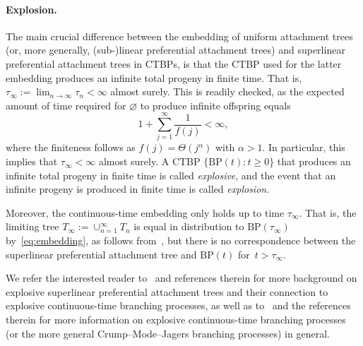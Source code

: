 \documentclass[11pt]{article}
\numberwithin{equation}{section}
\newcommand{\be}{\begin{equation}}
\newcommand{\ee}{\end{equation}}
\newcommand{\bp}{\mathrm{BP}}
\theoremstyle{definition}
\begin{document}
\paragraph{Explosion.} The main crucial difference between the embedding of uniform attachment trees (or, more generally, (sub-)linear preferential attachment trees) and superlinear preferential attachment trees in CTBPs, is that the CTBP used for the latter embedding produces an infinite total progeny in finite time. That is, $\tau_\infty:=\lim_{n\to\infty}\tau_n<\infty$ almost surely. This is readily checked, as the expected amount of time required for $\varnothing$ to produce infinite offspring equals 
\be \label{eq:explcond}
1 +\sum_{j=1}^\infty \frac{1}{f(j)}<\infty, 
\ee 
where the finiteness follows as $f(j)=\Theta(j^\alpha)$ with $\alpha>1$. In particular, this implies that $\tau_\infty<\infty$ almost surely. A CTBP $\{\bp(t): t\geq 0\}$ that produces an infinite total progeny in finite time is called \emph{explosive}, and the event that an infinite progeny is produced in finite time is called \emph{explosion}. 

Moreover, the continuous-time embedding only holds up to time $\tau_\infty$. That is, the limiting tree $T_\infty:=\cup_{n=1}^\infty T_n$ is equal in distribution to $\bp(\tau_\infty)$ by~\eqref{eq:embedding}, as  follows from~\cite[Theorem~$4.3$]{oliveira2005connectivity}, but there is no correspondence between the superlinear preferential attachment tree and $\bp(t)$ for~$t>\tau_\infty$.

 We refer the interested reader to~\cite{oliveira2005connectivity,Athr07} and references therein for more background on explosive superlinear preferential attachment trees and their connection to explosive continuous-time branching processes, as well as to~\cite{Komjthy2016ExplosiveCB} and the references therein for more information on explosive continuous-time branching processes (or the more general Crump--Mode--Jagers branching processes) in general.
\end{document}
